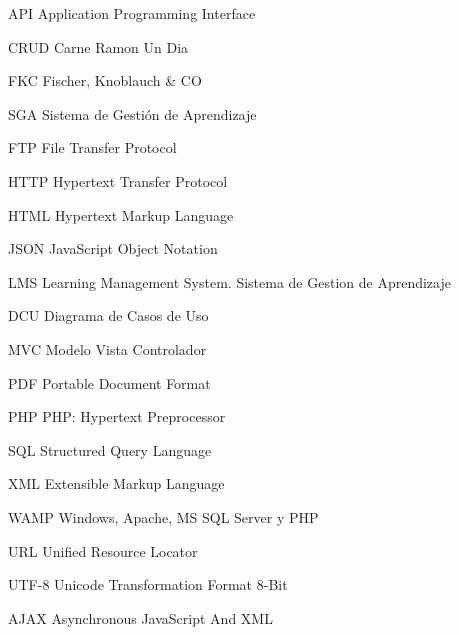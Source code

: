 	{API}
	{Application Programming Interface}

	{CRUD}
	{Carne Ramon Un Dia}

	{FKC}
	{Fischer, Knoblauch \& CO}

	{SGA}
	{Sistema de Gestión de Aprendizaje}

	{FTP}
	{File Transfer Protocol}

	{HTTP}
	{Hypertext Transfer Protocol}

	{HTML}
	{Hypertext Markup Language}

	{JSON}
	{JavaScript Object Notation}

	{LMS}
	{Learning Management System. Sistema de Gestion de Aprendizaje}

	{DCU}
	{Diagrama de Casos de Uso}

	{MVC}
	{Modelo Vista Controlador}

	{PDF}
	{Portable Document Format}

	{PHP}
	{PHP: Hypertext Preprocessor}

	{SQL}
	{Structured Query Language}

	{XML}
	{Extensible Markup Language}

	{WAMP}
	{Windows, Apache, MS SQL Server y PHP}

	{URL}
	{Unified Resource Locator}

	{UTF-8}
	{Unicode Transformation Format 8-Bit}

	{AJAX}
	{Asynchronous JavaScript And XML}

